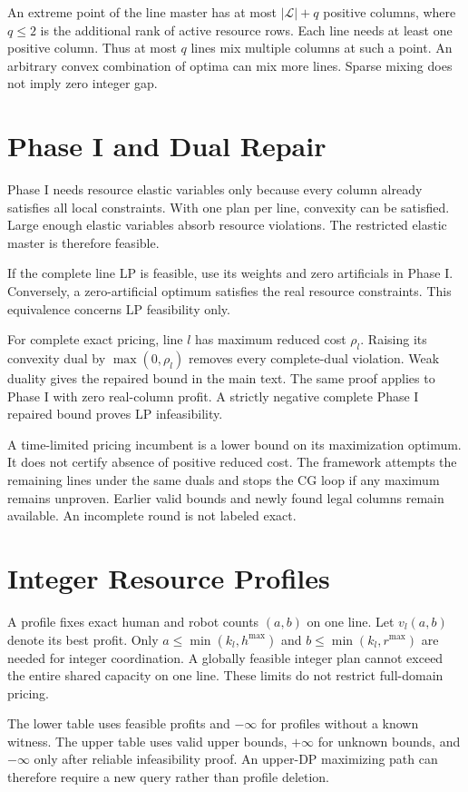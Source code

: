 \documentclass[letterpaper,journal]{IEEEtran}
\begin{document}
An extreme point of the line master has at most $|\mathcal L|+q$ positive columns, where $q\leq2$ is the additional rank of active resource rows. Each line needs at least one positive column. Thus at most $q$ lines mix multiple columns at such a point. An arbitrary convex combination of optima can mix more lines. Sparse mixing does not imply zero integer gap.

\section{Phase I and Dual Repair}
Phase I needs resource elastic variables only because every column already satisfies all local constraints. With one plan per line, convexity can be satisfied. Large enough elastic variables absorb resource violations. The restricted elastic master is therefore feasible.

If the complete line LP is feasible, use its weights and zero artificials in Phase I. Conversely, a zero-artificial optimum satisfies the real resource constraints. This equivalence concerns LP feasibility only.

For complete exact pricing, line $l$ has maximum reduced cost $\rho_l$. Raising its convexity dual by $\max(0,\rho_l)$ removes every complete-dual violation. Weak duality gives the repaired bound in the main text. The same proof applies to Phase I with zero real-column profit. A strictly negative complete Phase I repaired bound proves LP infeasibility.

A time-limited pricing incumbent is a lower bound on its maximization optimum. It does not certify absence of positive reduced cost. The framework attempts the remaining lines under the same duals and stops the CG loop if any maximum remains unproven. Earlier valid bounds and newly found legal columns remain available. An incomplete round is not labeled exact.

\section{Integer Resource Profiles}
A profile fixes exact human and robot counts $(a,b)$ on one line. Let $v_l(a,b)$ denote its best profit. Only $a\leq\min(k_l,h^{\max})$ and $b\leq\min(k_l,r^{\max})$ are needed for integer coordination. A globally feasible integer plan cannot exceed the entire shared capacity on one line. These limits do not restrict full-domain pricing.

The lower table uses feasible profits and $-\infty$ for profiles without a known witness. The upper table uses valid upper bounds, $+\infty$ for unknown bounds, and $-\infty$ only after reliable infeasibility proof. An upper-DP maximizing path can therefore require a new query rather than profile deletion.
\end{document}
